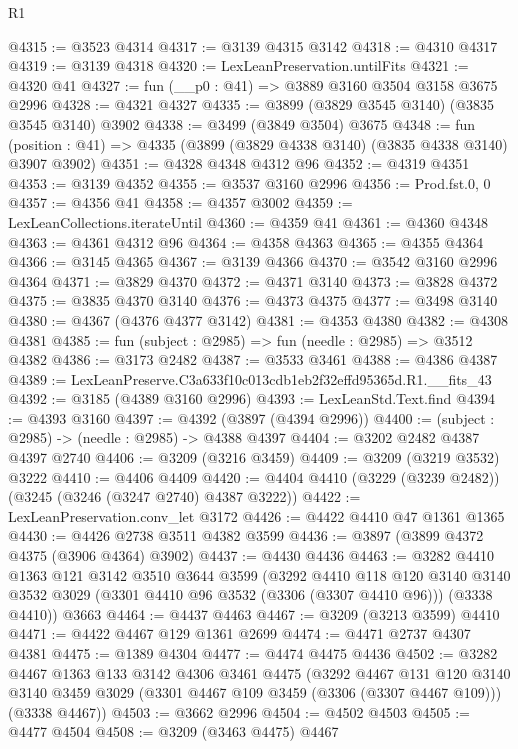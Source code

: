 \begin{lexlean}{R1}
\begin{coremodule}
@4315 := @3523 @4314
@4317 := @3139 @4315 @3142
@4318 := @4310 @4317
@4319 := @3139 @4318
@4320 := LexLeanPreservation.untilFits
@4321 := @4320 @41
@4327 := fun (__p0 : @41) => @3889 @3160 @3504 @3158 @3675 @2996
@4328 := @4321 @4327
@4335 := @3899 (@3829 @3545 @3140) (@3835 @3545 @3140) @3902
@4338 := @3499 (@3849 @3504) @3675
@4348 := fun (position : @41) => @4335 (@3899 (@3829 @4338 @3140) (@3835 @4338 @3140) @3907 @3902)
@4351 := @4328 @4348 @4312 @96
@4352 := @4319 @4351
@4353 := @3139 @4352
@4355 := @3537 @3160 @2996
@4356 := Prod.fst.{0, 0}
@4357 := @4356 @41
@4358 := @4357 @3002
@4359 := LexLeanCollections.iterateUntil
@4360 := @4359 @41
@4361 := @4360 @4348
@4363 := @4361 @4312 @96
@4364 := @4358 @4363
@4365 := @4355 @4364
@4366 := @3145 @4365
@4367 := @3139 @4366
@4370 := @3542 @3160 @2996 @4364
@4371 := @3829 @4370
@4372 := @4371 @3140
@4373 := @3828 @4372
@4375 := @3835 @4370 @3140
@4376 := @4373 @4375
@4377 := @3498 @3140
@4380 := @4367 (@4376 @4377 @3142)
@4381 := @4353 @4380
@4382 := @4308 @4381
@4385 := fun (subject : @2985) => fun (needle : @2985) => @3512 @4382
@4386 := @3173 @2482
@4387 := @3533 @3461
@4388 := @4386 @4387
@4389 := LexLeanPreserve.C3a633f10c013cdb1eb2f32effd95365d.R1.__fits_43
@4392 := @3185 (@4389 @3160 @2996)
@4393 := LexLeanStd.Text.find
@4394 := @4393 @3160
@4397 := @4392 (@3897 (@4394 @2996))
@4400 := (subject : @2985) -> (needle : @2985) -> @4388 @4397
@4404 := @3202 @2482 @4387 @4397 @2740
@4406 := @3209 (@3216 @3459)
@4409 := @3209 (@3219 @3532) @3222
@4410 := @4406 @4409
@4420 := @4404 @4410 (@3229 (@3239 @2482)) (@3245 (@3246 (@3247 @2740) @4387 @3222))
@4422 := LexLeanPreservation.conv_let @3172
@4426 := @4422 @4410 @47 @1361 @1365
@4430 := @4426 @2738 @3511 @4382 @3599
@4436 := @3897 (@3899 @4372 @4375 (@3906 @4364) @3902)
@4437 := @4430 @4436
@4463 := @3282
    @4410
    @1363
    @121
    @3142
    @3510
    @3644
    @3599
    (@3292
      @4410
      @118
      @120
      @3140
      @3140
      @3532
      @3029
      (@3301 @4410 @96 @3532 (@3306 (@3307 @4410 @96)))
      (@3338 @4410))
    @3663
@4464 := @4437 @4463
@4467 := @3209 (@3213 @3599) @4410
@4471 := @4422 @4467 @129 @1361 @2699
@4474 := @4471 @2737 @4307 @4381
@4475 := @1389 @4304
@4477 := @4474 @4475 @4436
@4502 := @3282
    @4467
    @1363
    @133
    @3142
    @4306
    @3461
    @4475
    (@3292
      @4467
      @131
      @120
      @3140
      @3140
      @3459
      @3029
      (@3301 @4467 @109 @3459 (@3306 (@3307 @4467 @109)))
      (@3338 @4467))
@4503 := @3662 @2996
@4504 := @4502 @4503
@4505 := @4477 @4504
@4508 := @3209 (@3463 @4475) @4467

\end{coremodule}
\end{lexlean}
